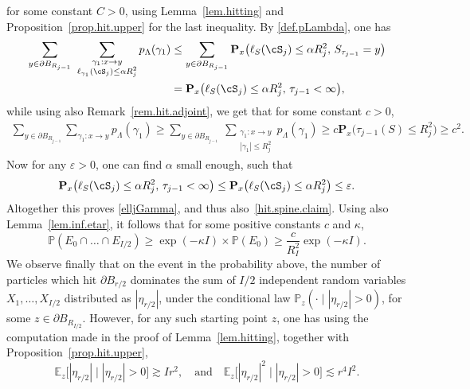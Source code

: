 for some constant $C>0$, using Lemma~\ref{lem.hitting} and Proposition~\ref{prop.hit.upper} for the last inequality. By \eqref{def.pLambda},
one has
\begin{align*}
\sum_{y\in \partial B_{R_{j-1}}}\ \sum_{\substack{\gamma_1:x \to y \\
\ell_{\gamma_1}(\cS_j)\le \alpha R_j^2}} p_\Lambda(\gamma_1)
& \le \sum_{y\in \partial B_{R_{j-1}}}
\mathbf P_x\big(\ell_S(\cS_j) \le \alpha R_j^2,\, S_{\tau_{j-1}}=y\big)\\
& = \mathbf P_x\big(\ell_S(\cS_j) \le \alpha R_j^2,\, \tau_{j-1}<\infty \big),
\end{align*}
while using also Remark~\ref{rem.hit.adjoint}, we get that for some constant $c>0$,
\begin{align*}
\sum_{y\in \partial B_{R_{j-1}}} \sum_{\gamma_1:x \to y} p_\Lambda(\gamma_1)
\ge \sum_{y\in \partial B_{R_{j-1}}} \ \sum_{\substack{\gamma_1:x \to y \\ |\gamma_1|\le R_j^2}} p_\Lambda(\gamma_1) \ge c \mathbf P_x\big(\tau_{j-1}(S)\le R_j^2) \ge c^2.
\end{align*}
Now for any $\varepsilon>0$, one can find $\alpha$ small enough, such that
\[
\mathbf P_x\big(\ell_S(\cS_j) \le \alpha R_j^2,\, \tau_{j-1}<\infty \big)\le \mathbf P_x\big(\ell_S(\cS_j) \le \alpha R_j^2\big)\le \varepsilon.
\]
Altogether this proves \eqref{elljGamma}, and thus also~\eqref{hit.spine.claim}. Using also Lemma~\ref{lem.inf.etar}, it follows that for some positive constants $c$ and $\kappa$,
\begin{equation*}%
\mathbb P(E_0\cap \dots \cap E_{I/2}) \ge \exp(-\kappa I)\times\mathbb P(E_0) \ge \frac{c}{R_I^2} \exp(-\kappa I).
\end{equation*}
We observe finally that on the event in the probability above,
the number of particles which hit $\partial B_{r/2}$ dominates the sum of $I/2$ independent random variables $X_1,\dots,X_{I/2}$ distributed as $|\eta_{r/2}|$,
under the conditional law $\mathbb P_z(\cdot \mid |\eta_{r/2}|>0)$,
for some $z\in \partial B_{R_{I/2}}$.
However, for any such starting point $z$, one has using the computation made in the proof of Lemma~\ref{lem.hitting}, together
with Proposition~\ref{prop.hit.upper},
\[
\mathbb E_z\big[|\eta_{r/2}|\mid |\eta_{r/2}|> 0\big] \gtrsim I r^2, \quad\text{and}\quad
\mathbb E_z\big[|\eta_{r/2}|^2\mid |\eta_{r/2}|>0\big] \lesssim r^4I^2.
\]

